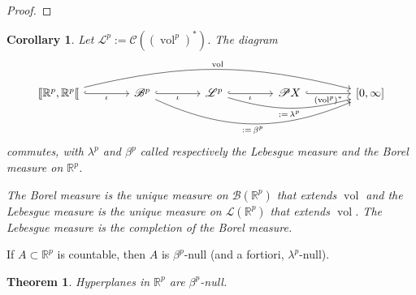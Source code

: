 \documentclass[11pt, a4paper, openany]{book}
\newtheorem{thm}{Theorem}\newtheorem{lem}{Lemma}\newtheorem{crl}{Corollary}
\theoremstyle{definition}
\DeclareMathOperator{\vol}{vol}
\begin{document}
    \begin{proof}
        
    \end{proof}
    \begin{crl}
        Let $\mathscr{L}^p:=\mathscr{C}((\vol^p)^*)$. The diagram
        \[
            \begin{tikzcd}[column sep = {40pt}]
                \llbracket\mathbb{R}^p,\mathbb{R}^p\llbracket \ar[r, hook, "\iota"' ] \ar[rrrr, "\vol", bend left=14] &\mathscr{B}^p \ar[r, hook, "\iota"']  \ar[rrr, ":=\,\beta^p"', bend right=24] & \mathscr{L}^p \ar[rr, ":=\,\lambda^p"', bend right=16] \ar[r, hook, "\iota"']& \mathscr{P}X \ar[r, hook, "(\vol^p)^*"'] & {[0,\infty]}
            \end{tikzcd}
        \]
        commutes, with $\lambda^p$ and $\beta^p$ called respectively the Lebesgue measure and the Borel measure on $\mathbb{R}^p$.

        The Borel measure is the unique measure on $\mathscr{B}(\mathbb{R}^p)$ that extends $\vol$ and the Lebesgue measure is the unique measure on $\mathscr{L}(\mathbb{R}^p)$ that extends $\vol$. The Lebesgue measure is the completion of the Borel measure.
    \end{crl}
    If $A\subset\mathbb{R}^p$ is countable, then $A$ is $\beta^p$-null (and a fortiori, $\lambda^p$-null).
    \begin{thm}
        Hyperplanes in $\mathbb{R}^p$ are $\beta^p$-null.
    \end{thm}
\end{document}
